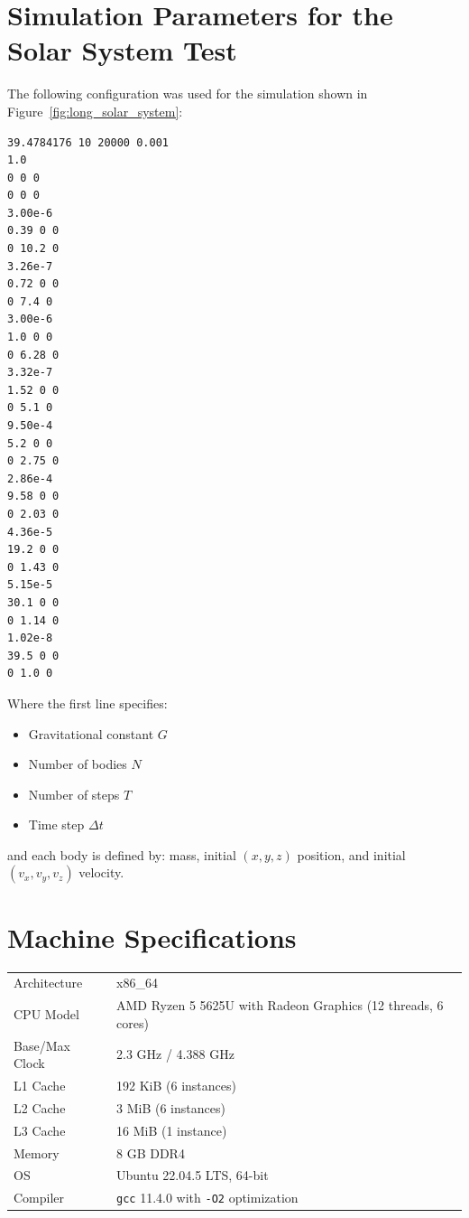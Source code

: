 \documentclass{article}
\begin{document}
%
%

\appendix


\section[Simulation Parameters (Solar System)]{Simulation Parameters for the Solar System Test}
\label{appendix:solar_params}

The following configuration was used for the simulation shown in Figure~\ref{fig:long_solar_system}:

\begin{verbatim}
39.4784176 10 20000 0.001
1.0
0 0 0
0 0 0
3.00e-6
0.39 0 0
0 10.2 0
3.26e-7
0.72 0 0
0 7.4 0
3.00e-6
1.0 0 0
0 6.28 0
3.32e-7
1.52 0 0
0 5.1 0
9.50e-4
5.2 0 0
0 2.75 0
2.86e-4
9.58 0 0
0 2.03 0
4.36e-5
19.2 0 0
0 1.43 0
5.15e-5
30.1 0 0
0 1.14 0
1.02e-8
39.5 0 0
0 1.0 0
\end{verbatim}

Where the first line specifies:
\begin{itemize}
    \item Gravitational constant $G$
    \item Number of bodies $N$
    \item Number of steps $T$
    \item Time step $\Delta t$
\end{itemize}
and each body is defined by: mass, initial $(x, y, z)$ position, and initial $(v_x, v_y, v_z)$ velocity.

\section[Machine Specifications]{Machine Specifications}
\label{appendix:machine_specs}
\begin{tabular}{ll}
\toprule
Architecture & x86\_64 \\
CPU Model & AMD Ryzen 5 5625U with Radeon Graphics (12 threads, 6 cores) \\
Base/Max Clock & 2.3 GHz / 4.388 GHz \\
L1 Cache & 192 KiB (6 instances) \\
L2 Cache & 3 MiB (6 instances) \\
L3 Cache & 16 MiB (1 instance) \\
Memory & 8 GB DDR4 \\
OS & Ubuntu 22.04.5 LTS, 64-bit \\
Compiler & \texttt{gcc} 11.4.0 with \texttt{-O2} optimization \\
\bottomrule
\end{tabular}
\end{document}
